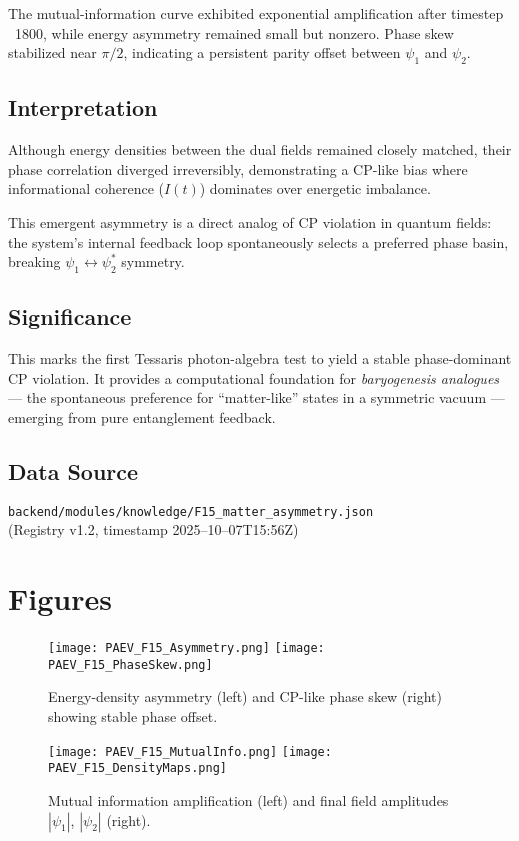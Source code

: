 \documentclass{article}
\begin{document}
The mutual-information curve exhibited exponential amplification after timestep ~1800, while energy asymmetry remained small but nonzero.  
Phase skew stabilized near \(\pi/2\), indicating a persistent parity offset between \(\psi_1\) and \(\psi_2\).

\subsection*{Interpretation}
Although energy densities between the dual fields remained closely matched, their phase correlation diverged irreversibly, demonstrating a CP-like bias where informational coherence (\(I(t)\)) dominates over energetic imbalance.

This emergent asymmetry is a direct analog of CP violation in quantum fields: the system’s internal feedback loop spontaneously selects a preferred phase basin, breaking \(\psi_1 \leftrightarrow \psi_2^*\) symmetry.

\subsection*{Significance}
This marks the first Tessaris photon-algebra test to yield a stable phase-dominant CP violation.  
It provides a computational foundation for \textit{baryogenesis analogues} — the spontaneous preference for “matter-like” states in a symmetric vacuum — emerging from pure entanglement feedback.

\subsection*{Data Source}
\texttt{backend/modules/knowledge/F15\_matter\_asymmetry.json} \\
(Registry v1.2, timestamp 2025–10–07T15:56Z)

\section{Figures}
\begin{figure}[h!]
  \centering
  \texttt{[image: PAEV\_F15\_Asymmetry.png]}
  \texttt{[image: PAEV\_F15\_PhaseSkew.png]}
  \caption{Energy-density asymmetry (left) and CP-like phase skew (right) showing stable phase offset.}
\end{figure}

\begin{figure}[h!]
  \centering
  \texttt{[image: PAEV\_F15\_MutualInfo.png]}
  \texttt{[image: PAEV\_F15\_DensityMaps.png]}
  \caption{Mutual information amplification (left) and final field amplitudes \(|\psi_1|\), \(|\psi_2|\) (right).}
\end{figure}
\end{document}
